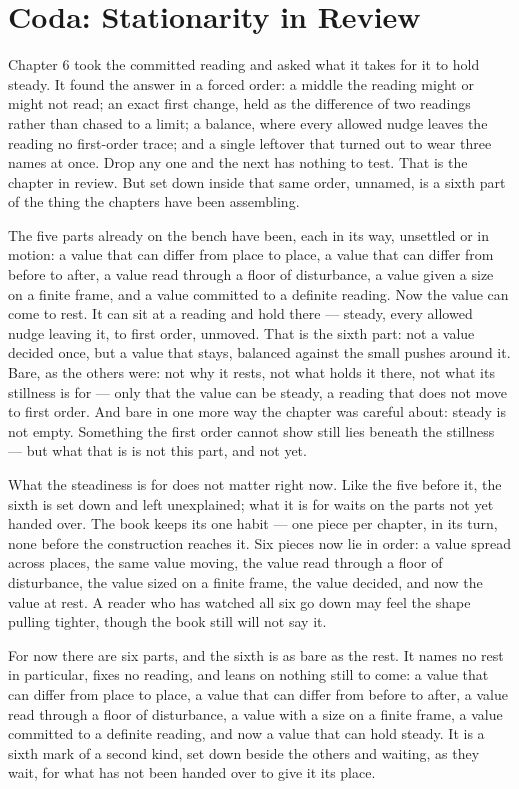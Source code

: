 \section*{Coda: Stationarity in Review}

Chapter 6 took the committed reading and asked what it takes for it to hold steady. It found the answer in a forced order: a middle the reading might or might not read; an exact first change, held as the difference of two readings rather than chased to a limit; a balance, where every allowed nudge leaves the reading no first-order trace; and a single leftover that turned out to wear three names at once. Drop any one and the next has nothing to test. That is the chapter in review. But set down inside that same order, unnamed, is a sixth part of the thing the chapters have been assembling.

The five parts already on the bench have been, each in its way, unsettled or in motion: a value that can differ from place to place, a value that can differ from before to after, a value read through a floor of disturbance, a value given a size on a finite frame, and a value committed to a definite reading. Now the value can come to rest. It can sit at a reading and hold there --- steady, every allowed nudge leaving it, to first order, unmoved. That is the sixth part: not a value decided once, but a value that stays, balanced against the small pushes around it. Bare, as the others were: not why it rests, not what holds it there, not what its stillness is for --- only that the value can be steady, a reading that does not move to first order. And bare in one more way the chapter was careful about: steady is not empty. Something the first order cannot show still lies beneath the stillness --- but what that is is not this part, and not yet.

What the steadiness is for does not matter right now. Like the five before it, the sixth is set down and left unexplained; what it is for waits on the parts not yet handed over. The book keeps its one habit --- one piece per chapter, in its turn, none before the construction reaches it. Six pieces now lie in order: a value spread across places, the same value moving, the value read through a floor of disturbance, the value sized on a finite frame, the value decided, and now the value at rest. A reader who has watched all six go down may feel the shape pulling tighter, though the book still will not say it.

For now there are six parts, and the sixth is as bare as the rest. It names no rest in particular, fixes no reading, and leans on nothing still to come: a value that can differ from place to place, a value that can differ from before to after, a value read through a floor of disturbance, a value with a size on a finite frame, a value committed to a definite reading, and now a value that can hold steady. It is a sixth mark of a second kind, set down beside the others and waiting, as they wait, for what has not been handed over to give it its place.
